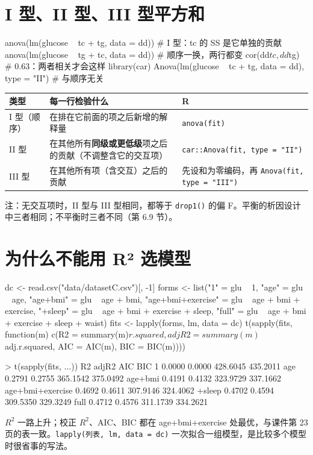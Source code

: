 \section{I 型、II 型、III 型平方和}
\begin{rcode}[R · 顺序与平方和类型]
anova(lm(glucose ~ tc + tg, data = dd))     # I 型：tc 的 SS 是它单独的贡献
anova(lm(glucose ~ tg + tc, data = dd))     # 顺序一换，两行都变
cor(dd$tc, dd$tg)                           # 0.63：两者相关才会这样
library(car)
Anova(lm(glucose ~ tc + tg, data = dd), type = "II")   # 与顺序无关
\end{rcode}

\begin{tabular}{p{2.2cm}p{7.2cm}p{4.6cm}}
\toprule
类型 & 每一行检验什么 & R\\
\midrule
I 型（顺序） & 在排在它前面的项之后新增的解释量 & \Verb|anova(fit)|\\
II 型 & 在其他所有\textbf{同级或更低级}项之后的贡献（不调整含它的交互项） & \Verb|car::Anova(fit, type = "II")|\\
III 型 & 在其他所有项（含交互）之后的贡献 & 先设和为零编码，再 \Verb|Anova(fit, type = "III")|\\
\bottomrule
\end{tabular}

\begin{studysource}
注：无交互项时，II 型与 III 型相同，都等于 \texttt{drop1()} 的偏 F。平衡的析因设计中三者相同；不平衡时三者不同（第 6.9 节）。
\end{studysource}


\section{为什么不能用 R² 选模型}
\begin{rcode}[R · 一组嵌套模型的五个指标]
dc <- read.csv("data/datasetC.csv")[, -1]
forms <- list("1" = glu ~ 1, "age" = glu ~ age, "age+bmi" = glu ~ age + bmi,
              "age+bmi+exercise" = glu ~ age + bmi + exercise,
              "+sleep" = glu ~ age + bmi + exercise + sleep,
              "full" = glu ~ age + bmi + exercise + sleep + waist)
fits <- lapply(forms, lm, data = dc)
t(sapply(fits, function(m) c(R2 = summary(m)$r.squared,
  adjR2 = summary(m)$adj.r.squared, AIC = AIC(m), BIC = BIC(m))))
\end{rcode}
\begin{routput}
> t(sapply(fits, ...))
                     R2  adjR2      AIC      BIC
1                0.0000 0.0000 428.6045 435.2011
age              0.2791 0.2755 365.1542 375.0492
age+bmi          0.4191 0.4132 323.9729 337.1662
age+bmi+exercise 0.4692 0.4611 307.9146 324.4062
+sleep           0.4702 0.4594 309.5350 329.3249
full             0.4712 0.4576 311.1739 334.2621
\end{routput}
$R^2$ 一路上升；校正 $R^2$、AIC、BIC 都在 age+bmi+exercise 处最优，与课件第 23 页的表一致。\Verb|lapply(列表, lm, data = dc)| 一次拟合一组模型，是比较多个模型时很省事的写法。


